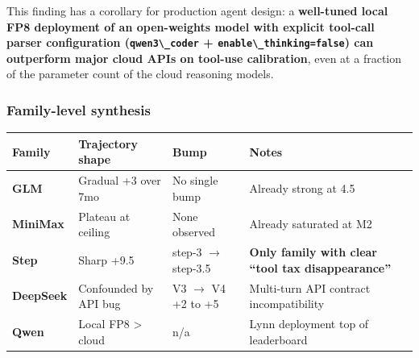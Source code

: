 \documentclass[11pt]{article}
\providecommand{\passthrough}[1]{#1}
\newcounter{none}
\begin{document}
This finding has a corollary for production agent design: a
\textbf{well-tuned local FP8 deployment of an open-weights model with
explicit tool-call parser configuration
(\passthrough{\lstinline!qwen3\_coder!} +
\passthrough{\lstinline!enable\_thinking=false!}) can outperform major
cloud APIs on tool-use calibration}, even at a fraction of the parameter
count of the cloud reasoning models.

\subsubsection{Family-level synthesis}\label{sec:family-level-synthesis}

{\def\LTcaptype{none} %
\begin{longtable}[]{@{}
  >{\raggedright\arraybackslash}p{}
  >{\raggedright\arraybackslash}p{}
  >{\raggedright\arraybackslash}p{}
  >{\raggedright\arraybackslash}p{}@{}}
\toprule\noalign{}
\begin{minipage}[b]{\linewidth}\raggedright
Family
\end{minipage} & \begin{minipage}[b]{\linewidth}\raggedright
Trajectory shape
\end{minipage} & \begin{minipage}[b]{\linewidth}\raggedright
Bump
\end{minipage} & \begin{minipage}[b]{\linewidth}\raggedright
Notes
\end{minipage} \\
\midrule\noalign{}
\endhead
\bottomrule\noalign{}
\endlastfoot
\textbf{GLM} & Gradual +3 over 7mo & No single bump & Already strong at
4.5 \\
\textbf{MiniMax} & Plateau at ceiling & None observed & Already
saturated at M2 \\
\textbf{Step} & Sharp +9.5 & step-3 $\rightarrow$ step-3.5 & \textbf{Only family
with clear ``tool tax disappearance''} \\
\textbf{DeepSeek} & Confounded by API bug & V3 $\rightarrow$ V4 +2 to +5 &
Multi-turn API contract incompatibility \\
\textbf{Qwen} & Local FP8 \textgreater{} cloud & n/a & Lynn deployment
top of leaderboard \\
\end{longtable}
}
\end{document}
